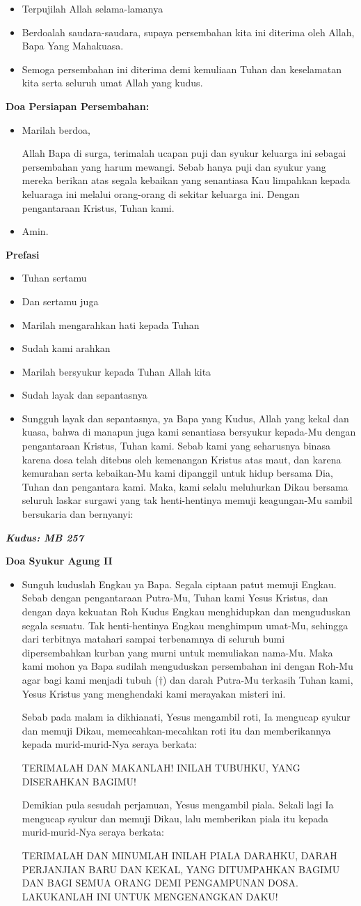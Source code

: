 \documentclass[12pt,two pages]{scrbook}
\makeatletter
\newcommand{\subjudul}[1]{%
  {\parindent \z@ \normalfont
    \interlinepenalty\@M \bfseries #1\par\nobreak \vskip 20\p@ }}
\newcommand{\lagu}[1]{%
  {\parindent \z@ \normalfont
    \interlinepenalty\@M \bfseries \emph{#1}\par\nobreak \vskip 20\p@ }}
\newcommand{\BU}[1]{\begin{itemize} \item[U:] #1 \end{itemize}}
\newcommand{\BI}[1]{\begin{itemize} \item[I:] #1 \end{itemize}}
\makeatother
\begin{document}
\BU{Terpujilah Allah selama-lamanya}

\BI{Berdoalah saudara-saudara, supaya persembahan kita ini diterima oleh Allah, Bapa Yang Mahakuasa.}

\BU{Semoga persembahan ini diterima demi kemuliaan Tuhan dan keselamatan kita serta seluruh umat Allah yang kudus.}

\subjudul{Doa Persiapan Persembahan:}

\BI{Marilah berdoa,

Allah Bapa di surga, terimalah ucapan puji dan syukur keluarga ini sebagai persembahan yang harum mewangi. Sebab hanya puji dan syukur yang mereka berikan atas segala kebaikan yang senantiasa Kau limpahkan kepada keluaraga ini melalui orang-orang di sekitar keluarga ini. Dengan pengantaraan Kristus, Tuhan kami.}

\BU{Amin.}

\subjudul{Prefasi}

\BI{Tuhan sertamu}
\BU{Dan sertamu juga}
\BI{Marilah mengarahkan hati kepada Tuhan}
\BU{Sudah kami arahkan}
\BI{Marilah bersyukur kepada Tuhan Allah kita}
\BU{Sudah layak dan sepantasnya}
\BI{Sungguh layak dan sepantasnya, ya Bapa yang Kudus, Allah yang kekal dan kuasa, bahwa di manapun juga kami senantiasa bersyukur kepada-Mu dengan pengantaraan Kristus, Tuhan kami. Sebab kami yang seharusnya binasa karena dosa telah ditebus oleh kemenangan Kristus atas maut, dan karena kemurahan serta kebaikan-Mu kami dipanggil untuk hidup bersama Dia, Tuhan dan pengantara kami. Maka, kami selalu meluhurkan Dikau bersama seluruh laskar surgawi yang tak henti-hentinya memuji keagungan-Mu sambil bersukaria dan bernyanyi:}

\lagu{Kudus: MB 257}

\subjudul{Doa Syukur Agung II}

\BI{Sunguh kuduslah Engkau ya Bapa. Segala ciptaan patut memuji Engkau. Sebab dengan pengantaraan Putra-Mu, Tuhan kami Yesus Kristus, dan dengan daya kekuatan Roh Kudus Engkau menghidupkan dan menguduskan segala sesuatu. Tak henti-hentinya Engkau menghimpun umat-Mu, sehingga dari terbitnya matahari sampai terbenamnya di seluruh bumi dipersembahkan kurban yang murni untuk memuliakan nama-Mu. Maka kami mohon ya Bapa sudilah menguduskan persembahan ini dengan Roh-Mu agar bagi kami menjadi tubuh ($\dagger$) dan darah Putra-Mu terkasih Tuhan kami, Yesus Kristus yang menghendaki kami merayakan misteri ini.

Sebab pada malam ia dikhianati, Yesus mengambil roti, Ia mengucap syukur dan memuji Dikau, memecahkan-mecahkan roti itu dan memberikannya kepada murid-murid-Nya seraya berkata:

TERIMALAH DAN MAKANLAH! INILAH TUBUHKU, YANG DISERAHKAN BAGIMU!

Demikian pula sesudah perjamuan, Yesus mengambil piala. Sekali lagi Ia mengucap syukur dan memuji Dikau, lalu memberikan piala itu kepada murid-murid-Nya seraya berkata:

TERIMALAH DAN MINUMLAH INILAH PIALA DARAHKU, DARAH PERJANJIAN BARU DAN KEKAL, YANG DITUMPAHKAN BAGIMU DAN BAGI SEMUA ORANG DEMI PENGAMPUNAN DOSA. LAKUKANLAH INI UNTUK MENGENANGKAN DAKU!}
\end{document}
